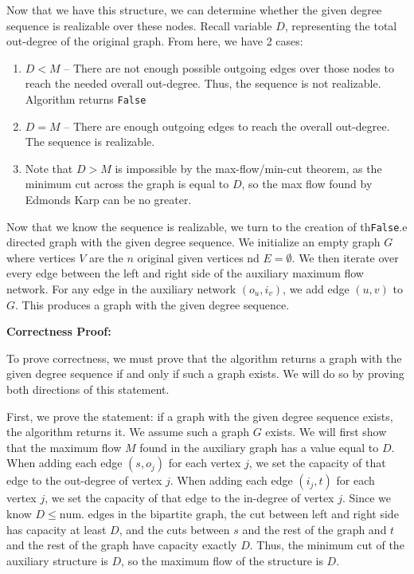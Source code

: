 \documentclass[11pt]{article}
\begin{document}
\begin{enumerate}
Now that we have this structure, we can determine whether the given degree sequence is realizable over these nodes. 
Recall variable $D$, representing the total out-degree of the original graph. From here, we have 2 cases:

\begin{enumerate}[label=(\arabic*), noitemsep]
    \item $D < M$ -- There are not enough possible outgoing edges over those nodes to reach the needed overall out-degree. 
    Thus, the sequence is not realizable. Algorithm returns \texttt{False}
    \item $D = M$ -- There are enough outgoing edges to reach the overall out-degree. The sequence is realizable.
    \item Note that $D > M$ is impossible by the max-flow/min-cut theorem, as the minimum cut across the graph is equal to $D$, 
    so the max flow found by Edmonds Karp can be no greater.
\end{enumerate}

Now that we know the sequence is realizable, we turn to the creation of th\texttt{False}.e directed graph with the given degree sequence. 
We initialize an empty graph $G$ where vertices $V$ are the $n$ original given vertices nd $E = \emptyset$.
We then iterate over every edge between the left and right side of the auxiliary maximum flow network. 
For any edge in the auxiliary network $(o_u, i_v)$, we add edge $(u, v)$ to $G$. 
This produces a graph with the given degree sequence.

\bigbreak

\textbf{Correctness Proof:}

To prove correctness, we must prove that the algorithm returns a graph with the given degree sequence if and only if such a graph exists. 
We will do so by proving both directions of this statement.

\medbreak

First, we prove the statement: if a graph with the given degree sequence exists, the algorithm returns it. 
We assume such a graph $G$ exists. We will first show that the maximum flow $M$ found in the auxiliary graph has a value equal to $D$. 
When adding each edge $(s, o_j)$ for each vertex $j$, we set the capacity of that edge to the out-degree of vertex $j$. 
When adding each edge $(i_j, t)$ for each vertex $j$, we set the capacity of that edge to the in-degree of vertex $j$. 
Since we know $D \leq \text{num. edges in the bipartite graph}$, the cut between left and right side has capacity at least $D$, 
and the cuts between $s$ and the rest of the graph and $t$ and the rest of the graph have capacity exactly $D$. 
Thus, the minimum cut of the auxiliary structure is $D$, so the maximum flow of the structure is $D$. 


\end{enumerate}
\end{document}
